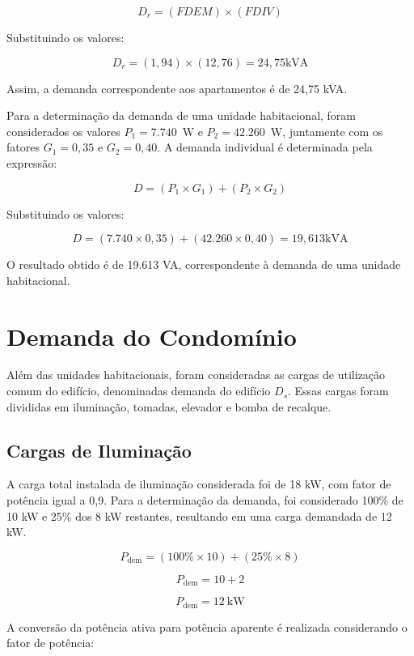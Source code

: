 \documentclass[12pt,openright,oneside,a4paper,brazil]{abntex2}
\begin{document}
\begin{equation}
    D_r = (FDEM) \times (FDIV) 
    \label{eq:demanda_apartamentos}
\end{equation}

Substituindo os valores:

\[
D_r = (1,94) \times (12,76) = 24,75 \mathrm{kVA}
\]

Assim, a demanda correspondente aos apartamentos é de 24,75 kVA.

Para a determinação da demanda de uma unidade habitacional, foram considerados os valores $P_1=7.740$~W e $P_2=42.260$~W, juntamente com os fatores $G_1=0,35$ e $G_2=0,40$. A demanda individual é determinada pela expressão:

\[
D = (P_1 \times G_1) + (P_2 \times G_2)
\]

Substituindo os valores:

\[
D = (7.740 \times 0,35) + (42.260 \times 0,40) = 19,613 \mathrm{kVA}
\]

O resultado obtido é de 19.613 VA, correspondente à demanda de uma unidade habitacional.

\section{Demanda do Condomínio}
\hspace{1.27cm}Além das unidades habitacionais, foram consideradas as cargas de utilização comum do edifício, denominadas demanda do edifício $D_s$. Essas cargas foram divididas em iluminação, tomadas, elevador e bomba de recalque.

\subsection{Cargas de Iluminação}
\hspace{1.27cm}A carga total instalada de iluminação considerada foi de 18 kW, com fator de potência igual a 0,9. Para a determinação da demanda, foi considerado 100\% de 10 kW e 25\% dos 8 kW restantes, resultando em uma carga demandada de 12 kW.

\begin{equation}
    P_{\mathrm{dem}} = (100\% \times 10) + (25\% \times 8)
    \label{eq:carga_iluminacao}
\end{equation}

\[
P_{\mathrm{dem}} = 10 + 2
\]

\[
P_{\mathrm{dem}} = 12\ \mathrm{kW}
\]

A conversão da potência ativa para potência aparente é realizada considerando o fator de potência:
\end{document}
